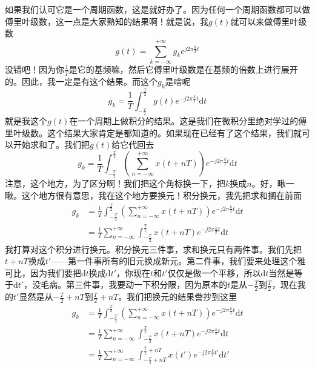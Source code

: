 \documentclass[a4paper,12pt]{article}
\begin{document}
如果我们认可它是一个周期函数，这是就好办了。因为任何一个周期函数都可以做傅里叶级数，这一点是大家熟知的结果啊！就是说，我$g(t)$就可以来做傅里叶级数
\begin{equation}
    g(t) = \sum_{k=-\infty}^{+\infty}g_k e^{j2\pi \frac{k}{T}t}
\end{equation}
没错吧！因为你$\frac{1}{T}$是它的基频嘛，然后它傅里叶级数是在基频的倍数上进行展开的。因此，我一定是有这个结果。而这个$g_k$是啥呢
\begin{equation}
    g_k = \frac{1}{T}\int_{-\frac{T}{2}}^{\frac{T}{2}}g(t)e^{-j2\pi\frac{k}{T}t}\text{d}t
\end{equation}
就是我这个$g(t)$在一个周期上做积分的结果。这是我们在微积分里绝对学过的傅里叶级数。这个结果大家肯定是都知道的。如果现在已经有了这个结果，我们就可以开始求和了。我们把$g(t)$给它代回去
\begin{equation}
    g_k = \frac{1}{T}\int_{-\frac{T}{2}}^{\frac{T}{2}}\left ( \sum_{n=-\infty}^{+\infty}x(t+nT)\right ) e^{-j2\pi \frac{k}{T}t}\text{d}t
\end{equation}
注意，这个地方，为了区分啊！我们把这个角标换一下，把$k$换成$n$。好，瞅一瞅。这个地方很有意思，我在这个地方要换元！积分换元，我先把求和搁在前面
\begin{equation}
\begin{aligned}
   g_k &= \frac{1}{T}\int_{-\frac{T}{2}}^{\frac{T}{2}}\left ( \sum_{n=-\infty}^{+\infty}x(t+nT)\right ) e^{-j2\pi \frac{k}{T}t}\text{d}t\\
&= \frac{1}{T}\sum_{n=-\infty}^{+\infty}\int_{-\frac{T}{2}}^{\frac{T}{2}}x(t+nT)e^{-j2\pi \frac{k}{T}t}\text{d}t
\end{aligned}
\end{equation}
我打算对这个积分进行换元。积分换元三件事，求和换元只有两件事。我们先把$t+nT$换成$t'$——第一件事所有的旧元换成新元。第二件事，我们要来处理这个雅可比，因为我们要把$\text{d}t$换成$\text{d}t'$，你现在$t$和$t'$仅仅是做一个平移，所以$\text{d}t$当然是等于$\text{d}t'$，没毛病。第三件事，我要动一下积分限，因为原本的$t$是从$-\frac{T}{2}$到$\frac{T}{2}$，现在我的$t'$显然是从$-\frac{T}{2}+nT$到$\frac{T}{2}+nT$。我们把换元的结果誊抄到这里
\begin{equation}
\begin{aligned}
   g_k &= \frac{1}{T}\int_{-\frac{T}{2}}^{\frac{T}{2}}\left ( \sum_{n=-\infty}^{+\infty}x(t+nT)\right ) e^{-j2\pi \frac{k}{T}t}\text{d}t\\
&= \frac{1}{T}\sum_{n=-\infty}^{+\infty}\int_{-\frac{T}{2}}^{\frac{T}{2}}x(t+nT)e^{-j2\pi \frac{k}{T}t}\text{d}t\\
&= \frac{1}{T}\sum_{n=-\infty}^{+\infty}\int_{-\frac{T}{2}+nT}^{\frac{T}{2}+nT}x(t')e^{-j2\pi \frac{k}{T}t'}\text{d}t'
\end{aligned}
\end{equation}
\end{document}
